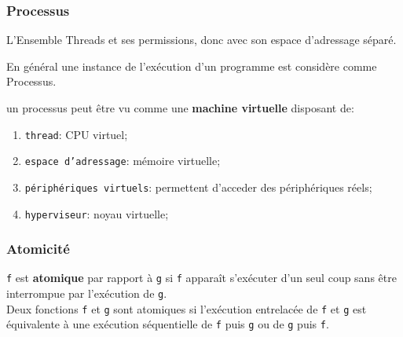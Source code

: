 \documentclass{article}
\begin{document}
\subsubsection{Processus}
\begin{definition}\label{def:processus}
    L'Ensemble Threads et ses permissions, donc avec son espace d'adressage séparé.

    \begin{remark}
        En général une instance de l'exécution d'un programme est considère comme Processus.
    \end{remark}

    \begin{phrase}
        un processus peut être vu comme une \textbf{machine virtuelle} disposant de:
        \begin{enumerate}[noitemsep]
            \item \texttt{thread}: CPU virtuel;
            \item \texttt{espace d'adressage}: mémoire virtuelle;
            \item \texttt{périphériques virtuels}: permettent d'acceder des périphériques réels;
            \item \texttt{hyperviseur}: noyau virtuelle;
        \end{enumerate}
    \end{phrase}
\end{definition}

\subsubsection{Atomicité}
\begin{definition}\label{def:atomicite}
    \texttt{f} est \textbf{atomique} par rapport à \texttt{g} si \texttt{f} apparaît s'exécuter d'un seul coup sans être interrompue par l'exécution de \texttt{g}.\\

    Deux fonctions \texttt{f} et \texttt{g} sont atomiques si l'exécution entrelacée de \texttt{f} et \texttt{g} est équivalente à une exécution séquentielle de \texttt{f} puis \texttt{g} ou de \texttt{g} puis \texttt{f}.
\end{definition}
\end{document}
